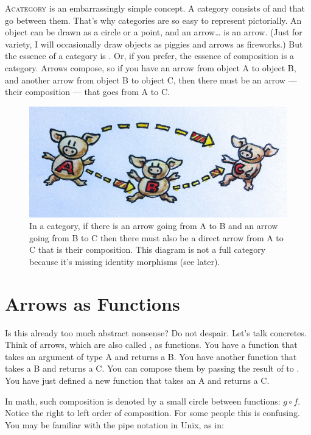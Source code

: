\lettrine[lhang=0.17]{A}{category} is an embarrassingly simple concept.
A category consists of  and  that go between them. That's
why categories are so easy to represent pictorially. An object can be
drawn as a circle or a point, and an arrow\ldots{} is an arrow. (Just
for variety, I will occasionally draw objects as piggies and arrows as
fireworks.) But the essence of a category is . Or, if you
prefer, the essence of composition is a category. Arrows compose, so
if you have an arrow from object A to object B, and another arrow from
object B to object C, then there must be an arrow --- their composition
--- that goes from A to C.

\begin{figure}
\centering
\includegraphics[width=\textwidth]{images/img_1330.jpg}
\caption{In a category, if there is an arrow going from A to B and an arrow going from B to C then there must also be a direct arrow from A to C that is their composition. This diagram is not a full category because it’s missing identity morphisms (see later).}
\end{figure}

\section{Arrows as Functions}\label{arrows-as-functions}

Is this already too much abstract nonsense? Do not despair. Let's talk
concretes. Think of arrows, which are also called , as
functions. You have a function  that takes an argument of type A and
returns a B. You have another function  that takes a B and returns a C.
You can compose them by passing the result of  to . You have just
defined a new function that takes an A and returns a C.

In math, such composition is denoted by a small circle between
functions: \ensuremath{g \circ f}. Notice the right to left order of composition. For some
people this is confusing. You may be familiar with the pipe notation in
Unix, as in:

